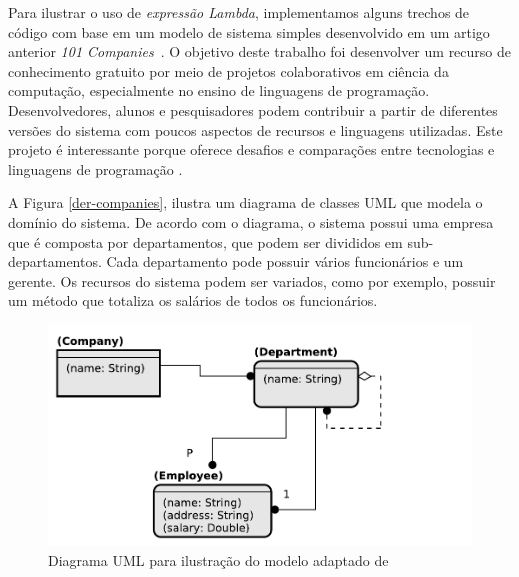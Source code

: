 \documentclass{article}
\begin{document}
Para ilustrar o uso de \emph{expressão Lambda}, implementamos alguns trechos de código com base em um modelo de sistema simples desenvolvido em um artigo anterior \emph{101 Companies}~\cite{favre2012101companies}. O objetivo deste trabalho foi desenvolver um recurso de conhecimento gratuito por meio de projetos colaborativos em ciência da computação, especialmente no ensino de linguagens de programação. Desenvolvedores, alunos e pesquisadores podem contribuir a partir de diferentes versões do sistema com poucos aspectos de recursos e linguagens utilizadas. Este projeto é interessante porque oferece desafios e comparações entre tecnologias e linguagens de programação \cite{favre2012101companies}.


A Figura \ref{der-companies}, ilustra um diagrama de classes UML que modela o domínio do sistema. De acordo com o diagrama, o sistema possui uma empresa que é composta por departamentos, que podem ser divididos em sub-departamentos. Cada departamento pode possuir vários funcionários e um gerente. Os recursos do sistema podem ser variados, como por exemplo, possuir um método que totaliza os salários de todos os funcionários.

\begin{figure}[H]
\label{der-companies}
\centering %
\includegraphics[width=\textwidth]{images/er-companies.pdf}
\caption{Diagrama UML para ilustração do modelo adaptado de \cite{favre2012101companies}}
\label{figura:tela do questionario}
\end{figure}
\end{document}
